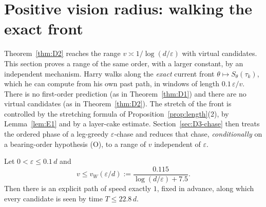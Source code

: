 
\section{Positive vision radius: walking the exact front}\label{sec:D3}

Theorem~\ref{thm:D2} reaches the range $v\asymp1/\log(d/\varepsilon)$ with virtual candidates. This section proves a range of
the same order, with a larger constant, by an independent mechanism. Harry walks along the \emph{exact} current front
$\theta\mapsto S_\theta(\tau_k)$, which he can compute from his own past path, in windows of length $0.1\,\varepsilon/v$. There is
no first-order prediction (as in Theorem~\ref{thm:D1}) and there are no virtual candidates (as in Theorem~\ref{thm:D2}). The
stretch of the front is controlled by the stretching formula of Proposition~\ref{prop:length}(2), by Lemma~\ref{lem:E1} and by
a layer-cake estimate. Section~\ref{sec:D3-chase} then treats the ordered phase of a leg-greedy $\varepsilon$-chase and reduces
that chase, \emph{conditionally} on a bearing-order hypothesis (O), to a range of $v$ independent of $\varepsilon$.

\begin{theorem}[D3.1]\label{thm:D3}
Let $0<\varepsilon\le0.1\,d$ and
\[
v\le v_W(\varepsilon/d):=\frac{0.115}{\log(d/\varepsilon)+7.5}.
\]
Then there is an explicit path of speed exactly $1$, fixed in advance, along which every candidate is seen by time
$T\le22.8\,d$.
\end{theorem}

